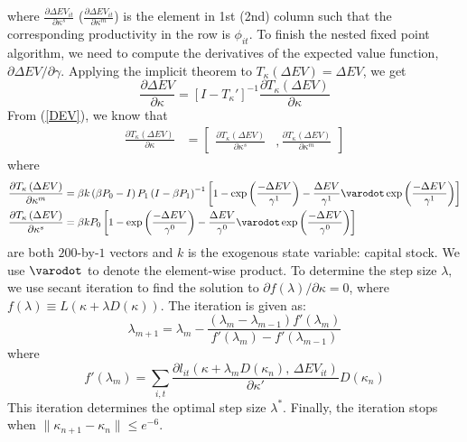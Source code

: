 where $\frac{\partial\Delta EV_{it}}{\partial\kappa^{s}}$ ($\frac{\partial\Delta EV_{it}}{\partial\kappa^{m}}$)
is the element in 1st (2nd) column such that the corresponding productivity
in the row is $\phi_{it}$. To finish the nested fixed point algorithm,
we need to compute the derivatives of the expected value function,
$\partial\Delta EV/\partial\gamma$. Applying the implicit theorem
to $T_{\kappa}\left(\Delta EV\right)=\Delta EV$, we get 
\[
\frac{\partial\Delta EV}{\partial\kappa}=\left[I-T_{\kappa}'\right]^{-1}\frac{\partial T_{\kappa}\left(\Delta EV\right)}{\partial\kappa}
\]
From (\ref{DEV}), we know that 
\begin{align*}
\frac{\partial T_{\kappa}\left(\Delta EV\right)}{\partial\kappa} & =\left[\begin{array}{cc}
\frac{\partial T_{\kappa}\left(\Delta EV\right)}{\partial\kappa^{s}} & ,\frac{\partial T_{\kappa}\left(\Delta EV\right)}{\partial\kappa^{m}}\end{array}\right]
\end{align*}
where 
\begin{align*}
\frac{\partial T_{\kappa}\left(\Delta EV\right)}{\partial\kappa^{m}} & =\beta k\left(\beta P_{0}-I\right)P_{1}\left(I-\beta P_{1}\right)^{-1}\left[1-\exp\left(\frac{-\Delta EV}{\gamma^{1}}\right)-\frac{\Delta EV}{\gamma^{1}}\varodot\exp\left(\frac{-\Delta EV}{\gamma^{1}}\right)\right]\\
\frac{\partial T_{\kappa}\left(\Delta EV\right)}{\partial\kappa^{s}} & =\beta kP_{0}\left[1-\exp\left(\frac{-\Delta EV}{\gamma^{0}}\right)-\frac{\Delta EV}{\gamma^{0}}\varodot\exp\left(\frac{-\Delta EV}{\gamma^{0}}\right)\right]
\end{align*}
are both $200$-by-$1$ vectors and $k$ is the exogenous state variable:
capital stock. We use $\varodot$ to denote the element-wise product.
To determine the step size $\lambda,$ we use secant iteration to
find the solution to $\partial f\left(\lambda\right)/\partial\kappa=0$,
where $f\left(\lambda\right)\equiv L\left(\kappa+\lambda D\left(\kappa\right)\right)$.
The iteration is given as:
\begin{equation}
\lambda_{m+1}=\lambda_{m}-\frac{\left(\lambda_{m}-\lambda_{m-1}\right)f'\left(\lambda_{m}\right)}{f'\left(\lambda_{m}\right)-f'\left(\lambda_{m-1}\right)}
\end{equation}
where 
\begin{equation}
f'\left(\lambda_{m}\right)=\sum_{i,t}\frac{\partial l_{it}\left(\kappa+\lambda_{m}D\left(\kappa_{n}\right),\,\Delta EV_{it}\right)}{\partial\kappa'}D\left(\kappa_{n}\right)
\end{equation}
This iteration determines the optimal step size $\lambda^{*}$. Finally,
the iteration stops when $\|\kappa_{n+1}-\kappa_{n}\|\leq e^{-6}$. 

